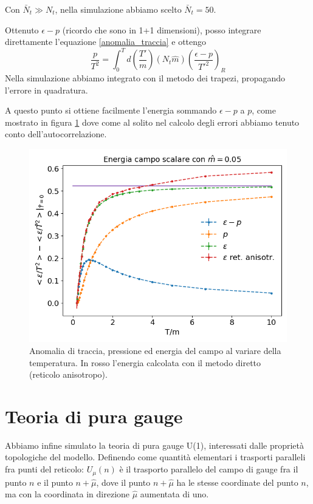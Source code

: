 \documentclass[a4paper, 12pt]{article}
\begin{document}
Con $\bar{N}_t \gg N_t$, nella simulazione abbiamo scelto $\bar{N}_t = 50$.

Ottenuto $\epsilon - p$ (ricordo che sono in 1+1 dimensioni),
posso integrare direttamente l'equazione \ref{anomalia_traccia} e ottengo
\begin{equation}
\frac{p}{T^2} = \int_0^T d\left(\frac{T'}{m} \right) (N_t \hat{m})
\left( \frac{\epsilon - p}{T'^2} \right)_R
\end{equation}
Nella simulazione abbiamo integrato con il metodo dei trapezi, propagando l'errore
in quadratura.

A questo punto si ottiene facilmente l'energia sommando $\epsilon - p$ a $p$,
come mostrato in figura \ref{campo_scalare_trace_anomaly}
dove come al solito nel calcolo degli errori abbiamo tenuto
conto dell'autocorrelazione.

\begin{figure}
\includegraphics[width=\linewidth]{../figure/trace_anomaly.png}
\caption{Anomalia di traccia, pressione ed energia del campo al variare
della temperatura. In rosso l'energia calcolata con il metodo diretto
(reticolo anisotropo).}
\label{campo_scalare_trace_anomaly}
\end{figure}


\section{Teoria di pura gauge}
Abbiamo infine simulato la teoria di pura gauge U(1), interessati dalle proprietà
topologiche del modello.
Definendo come quantità elementari i trasporti paralleli fra punti del reticolo: $U_{\mu}(n)$ è
il trasporto parallelo del campo di gauge fra il punto $n$ e il punto
$n + \hat{\mu}$, dove il punto $n + \hat{\mu}$ ha le stesse coordinate del punto
$n$, ma con la coordinata in direzione $\hat{\mu}$ aumentata di uno.
\end{document}

